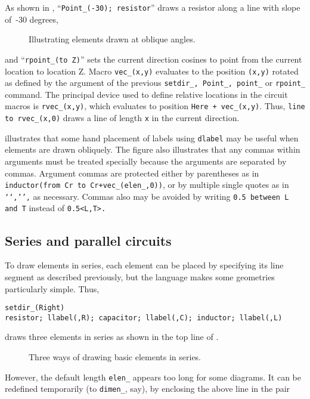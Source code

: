 As shown in ,
``{\tt Point\_(-30); resistor}'' draws a resistor
along a line with slope of~-30 degrees,
\begin{figure}[hbt]
\vspace{-\baselineskip}
   \parbox{4.5in}{\small }%
   \hfill\raise-0.7in\llap{\hbox{ }}%
   \vspace{-\baselineskip}
   \caption{Illustrating elements drawn at oblique angles.}
   \label{Oblique}
   \end{figure}
and ``{\tt rpoint\_(to Z)}'' sets
the current direction cosines to point from the current location to location Z.
Macro {\tt vec\_(x,y)}
evaluates to the position {\tt (x,y)} rotated as defined by the
argument of the previous
{\tt setdir\_, Point\_, point\_} or {\tt rpoint\_} command.
The principal device used to define relative locations in the circuit macros
is {\tt rvec\_(x,y)}, which evaluates to position {\tt Here + vec\_(x,y)}.
Thus, {\tt line to rvec\_(x,0)} draws a line of length {\tt x} in the current
direction.

 illustrates that some hand placement of labels
using {\tt dlabel} may be useful when elements are drawn obliquely.
The figure also illustrates that any commas within \Mfour arguments must
be treated specially because the arguments are separated by commas.
Argument commas are protected either by parentheses as in
{\tt inductor(from Cr to Cr+vec\_(elen\_,0))}, or by multiple single quotes
as in {\tt `{`,'}',} as necessary.
Commas also may be avoided by writing
{\tt 0.5 between L and T} instead of {\tt 0.5<L,T>.}

\subsection{Series and parallel circuits\label{Seriesandparallel:}}

To draw elements in series, each element can be placed by specifying
its line segment as described previously, but the \pic language
makes some geometries particularly simple.  Thus,

{\tt setdir\_(Right)\\ \hspace*{\parindent}%
  resistor; llabel(,R); capacitor; llabel(,C);
  inductor; llabel(,L)}

\noindent
draws three elements in series
as shown in the top line of .
\begin{figure}[H]
\vspace{-\baselineskip}
   
   \caption{Three ways of drawing basic elements in series.}
   \label{Series}
   \end{figure}
However, the default length {\tt elen\_}
appears too long for some diagrams.  It can be redefined temporarily
(to {\tt dimen\_}, say),
by enclosing the above line in the pair

